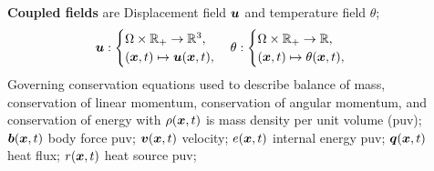 \documentclass[25pt, a0paper,
portrait,
margin=2mm, 
innermargin=2mm, 
blockverticalspace=7mm, %
colspace=2mm, %
subcolspace=0mm]{tikzposter}
\makeatletter
\newcommand*{\inputfig}[3][htb]{{
    \def\fps@figure{#1}
    \def\DIR{#2}
    \def\LABEL{#3}
    \graphicspath{{\DIR/}}
    
}}
\makeatother
\begin{document}
\begin{columns}
	{
		\begin{minipage}{0.35\textwidth}
			\begin{mdframed}
				\inputfig{floats/structuralfivefields_multi_edited}{structuralfivefields_multi_edited}
			\end{mdframed}
			\begin{mdframed}
				\textbf{Coupled fields} are  
				Displacement field ${\boldsymbol{\mathnormal u}}$ and temperature field $\theta$; 
				\begin{align*}
					{\boldsymbol{\mathnormal u}}:
					\begin{cases}
						\Omega \times \mathbb{R}_{+} \rightarrow \mathbb{R}^3, \\
						({\boldsymbol{\mathnormal x}},t) \mapsto {\boldsymbol{\mathnormal u}}({\boldsymbol{\mathnormal x}},t),
					\end{cases}
					\theta:
					\begin{cases}
						\Omega \times \mathbb{R}_{+} \rightarrow \mathbb{R}, \\
						({\boldsymbol{\mathnormal x}},t) \mapsto \theta({\boldsymbol{\mathnormal x}},t),
					\end{cases}
				\end{align*}
				Governing conservation equations
				used to describe balance of mass, 
				conservation of linear momentum, 
				conservation of angular momentum,
				and conservation of energy
				with
				$\rho({\boldsymbol{\mathnormal x}},t)$ is mass density per unit volume (puv); 
				${\boldsymbol{\mathnormal b}}({\boldsymbol{\mathnormal x}},t)$ body force puv; 
				${\boldsymbol{\mathnormal v}}({\boldsymbol{\mathnormal x}},t)$ velocity; 
				$e({\boldsymbol{\mathnormal x}},t)$ internal energy puv; 
				${\boldsymbol{\mathnormal q}}({\boldsymbol{\mathnormal x}},t)$ heat flux; 
				$r({\boldsymbol{\mathnormal x}},t)$ heat source puv; 

\end{mdframed}
\end{minipage}}
\end{columns}
\end{document}
